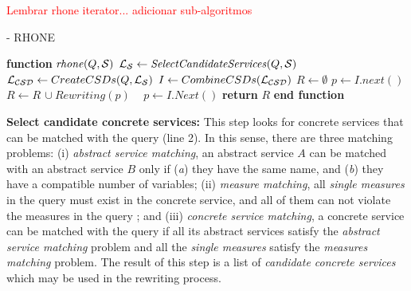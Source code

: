 \textcolor{red}{Lembrar rhone iterator... adicionar sub-algoritmos}

\begin{algorithm}
\small
\caption{ - RHONE}
\label{algo-rhone}
\begin{algorithmic}[1]
\STATE \textbf{function} $\mathit{rhone} (Q, \hbox{${\cal S}$})$
 \STATE  $\hbox{${\cal L_{S}}$} \leftarrow \mathit{SelectCandidateServices}(Q, \hbox{${\cal S}$})$ \label{rhone:buildPCD}
 \STATE  $\hbox{${\cal L_{CSD}}$} \leftarrow CreateCSDs(Q, \hbox{${\cal L_{S}}$})$
 \STATE  $I \leftarrow CombineCSDs(\hbox{${\cal L_{CSD}}$})$
 \STATE $R\leftarrow \emptyset$
    \STATE $p \leftarrow I.next()$
  \STATE $R\leftarrow R\,\cup \mathit{Rewriting}(p)$
  \STATE ~\!
   \ENDIF
      \STATE $p \leftarrow I.\mathit{Next}()$
 \ENDWHILE
    \STATE \textbf{return} $R$
\STATE \textbf{end function}
\end{algorithmic}
\end{algorithm}

\noindent \textbf{Select candidate concrete services:} This step
 looks for concrete services that can be matched with the query (line 2). In
 this sense, there are three matching problems: 
 (i) \textit{abstract service matching}, an abstract service $A$ can be
 matched with an abstract service $B$ only if (\textit{a}) they have the same
 name, and (\textit{b}) they have a compatible number of variables;
 (ii) \textit{measure matching}, all \textit{single measures} in the query must
 exist in the concrete service, and all of them can not violate the measures in
 the query ; and 
 (iii) \textit{concrete service matching}, a concrete service can
 be matched with the query if all its abstract services satisfy the \textit{abstract service
 matching} problem and all the \textit{single measures} satisfy the \textit{measures matching} problem.
The result of this step is a list of \textit{candidate concrete services} which
may be used in the rewriting process.


